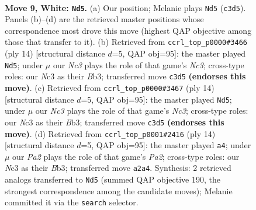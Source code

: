 \documentclass[11pt]{article}
\begin{document}
\begin{figure}[p]\centering
\begin{subfigure}{0.46\textwidth}\centering
\resizebox{\linewidth}{!}{%
\newchessgame
\chessboard[
  setfen={r1bqk2r/2p1bpp1/p1np1n2/1p2p2p/4P3/1BN2N2/PPPP1PPP/R1BQR1K1 w kq - 0 9},
  showmover=false,
  pgfstyle=straightmove, color=movearrow, markmove={c3-d5}
]}
\caption{}
\end{subfigure}\hfill
\begin{subfigure}{0.46\textwidth}\centering
\resizebox{\linewidth}{!}{%
\newchessgame
\chessboard[
  setfen={r1bqk2r/2p1bppp/p1np1n2/1p2p3/4P3/1BN2N2/PPPP1PPP/R1BQ1RK1 w kq - 0 8},
  showmover=false,
  pgfstyle=straightmove, color=movearrow, markmove={c3-d5}
]}
\caption{}
\end{subfigure}
\\[4pt]
\begin{subfigure}{0.46\textwidth}\centering
\resizebox{\linewidth}{!}{%
\newchessgame
\chessboard[
  setfen={r1bqk2r/2p1bppp/p1np1n2/1p2p3/4P3/1BN2N2/PPPP1PPP/R1BQ1RK1 w kq - 0 8},
  showmover=false,
  pgfstyle=straightmove, color=movearrow, markmove={c3-d5}
]}
\caption{}
\end{subfigure}\hfill
\begin{subfigure}{0.46\textwidth}\centering
\resizebox{\linewidth}{!}{%
\newchessgame
\chessboard[
  setfen={r1bqk2r/2p1bppp/p1np1n2/1p2p3/4P3/1BN2N2/PPPP1PPP/R1BQ1RK1 w kq - 0 8},
  showmover=false,
  pgfstyle=straightmove, color=movearrow, markmove={a2-a4}
]}
\caption{}
\end{subfigure}
\caption{\textbf{Move 9, White: \texttt{Nd5}.} (a) Our position; Melanie plays \texttt{Nd5} (\texttt{c3d5}). Panels (b)--(d) are the retrieved master positions whose correspondence most drove this move (highest QAP objective among those that transfer to it). (b) Retrieved from \texttt{ccrl\_top\_p0000\#3466} (ply 14) [structural distance $d$=5, QAP obj=95]: the master played \texttt{Nd5}; under $\mu$ our \emph{Nc3} plays the role of that game's \emph{Nc3}; cross-type roles: our \emph{N}c3 as their \emph{B}b3; transferred move \texttt{c3d5} \textbf{(endorses this move)}. (c) Retrieved from \texttt{ccrl\_top\_p0000\#3467} (ply 14) [structural distance $d$=5, QAP obj=95]: the master played \texttt{Nd5}; under $\mu$ our \emph{Nc3} plays the role of that game's \emph{Nc3}; cross-type roles: our \emph{N}c3 as their \emph{B}b3; transferred move \texttt{c3d5} \textbf{(endorses this move)}. (d) Retrieved from \texttt{ccrl\_top\_p0001\#2416} (ply 14) [structural distance $d$=5, QAP obj=95]: the master played \texttt{a4}; under $\mu$ our \emph{Pa2} plays the role of that game's \emph{Pa2}; cross-type roles: our \emph{N}c3 as their \emph{B}b3; transferred move \texttt{a2a4}. Synthesis: 2 retrieved analogs transferred to \texttt{Nd5} (summed QAP objective 190, the strongest correspondence among the candidate moves); Melanie committed it via the \texttt{search} selector.}
\label{fig:thought-m16}
\end{figure}
\end{document}
